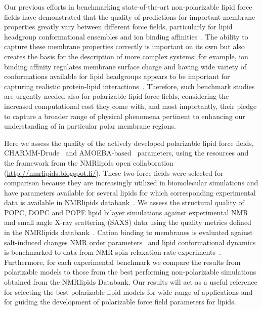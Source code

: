 \documentclass[journal=jctcce,manuscript=article,layout=singlecolumn]{achemso}
\begin{document}
Our previous efforts in benchmarking state-of-the-art non-polarizable lipid force fields have demonstrated that the quality of predictions for important membrane properties greatly vary between different force fields, particularly for lipid headgroup conformational ensembles and ion binding affinities~\cite{Botan2015,Catte2016,Antila2019,bacle21,Antila2021,Antila2022,Databank}. The ability to capture these membrane properties correctly is important on its own but also creates the basis for the description of more complex systems: for example, ion binding affinity regulates membrane surface charge and having wide variety of conformations available for lipid headgroups appears to be important for capturing realistic protein-lipid interactions~\cite{bacle21}. Therefore, such benchmark studies are urgently needed also for polarizable lipid force fields, considering  the increased computational cost they come with, and most importantly, their pledge
to capture a broader range of physical phenomena pertinent to enhancing our understanding of in particular polar membrane regions.


Here we assess the quality of the actively developed polarizable lipid force fields, CHARMM-Drude~\cite{li2017drude,yu2023drude} and  AMOEBA-based~\cite{chu2018anionicpolarizable,chu2018polarizable} parameters, using the resources and the framework from the NMRlipids open collaboration (\url{http://nmrlipids.blogspot.fi/}). These two force fields were selected for comparison because they are increasingly utilized in biomolecular simulations and have parameters available for several lipids for which corresponding experimental data is available in NMRlipids databank~\cite{Databank}. We assess the structural quality of POPC, DOPC and POPE lipid bilayer simulations against experimental NMR and small angle X-ray scattering (SAXS) data using the quality metrics defined in the NMRlipids databank~\cite{Databank}. Cation binding to membranes is evaluated against salt-induced changes NMR order parameters~\cite{Catte2016} and lipid conformational dynamics is benchmarked to data from NMR spin relaxation rate experiments~\cite{ferreira15,Antila2021}. 
Furthermore, for each experimental benchmark we compare the results from polarizable models to those from the best performing non-polarizable simulations obtained from the NMRlipids Databank\cite{Databank}. Our results will act as a useful reference for selecting the best polarizable lipid models for wide range of applications and for guiding the development of polarizable force field parameters for lipids.
\end{document}
